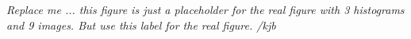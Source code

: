 \label{fig:BlueGreenRed}\textit{Replace me ... this figure is just a placeholder for the real figure with 3 histograms and 9 images. But use this label for the real figure. /kjb}